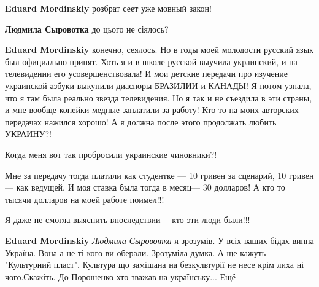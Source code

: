 \begin{itemize}
\begin{itemize}

\textbf{Eduard Mordinskiy} розбрат сеет уже мовный закон!


\textbf{Людмила Сыровотка} до цього не сіялось?


\textbf{Eduard Mordinskiy} конечно, сеялось. Но в годы моей молодости русский
язык был официально принят. Хоть я и в школе русской выучила украинский, и на
телевидении его усовершенствовала! И мои детские передачи про изучение
украинской азбуки выкупили диаспоры БРАЗИЛИИ и КАНАДЫ! Я потом узнала, что я
там была реально звезда телевидения. Но я так и не съездила в эти страны, и мне
вообще копейки медные заплатили за работу! Кто то на моих авторских передачах
нажился хорошо! А я должна после этого продолжать любить УКРАИНУ?!


Когда меня вот так пробросили украинские чиновники?!


Мне за передачу тогда платили как студентке — 10 гривен за сценарий, 10 гривен— как ведущей. И моя ставка была тогда в месяц— 30 долларов! А кто то тысячи долларов на моей работе поимел!!!


Я даже не смогла выяснить впоследствии— кто эти люди были!!!

\textbf{Eduard Mordinskiy}
\emph{Людмила Сыровотка} я зрозумів. У всіх ваших бідах винна Україна. Вона а не ті кого ви оберали. Зрозуміла думка. А ще кажуть "Культурний пласт". Культура що замішана на безкультурії не несе крім лиха ні чого.Скажіть. До Порошенко хто зважав на українську... Ещё



\end{itemize}
\end{itemize}
